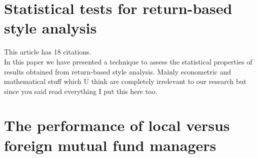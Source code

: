 \documentclass[12 pt]{article}
\begin{document}
\section{Statistical tests for return-based style analysis}
This article has 18 citations.\\
In this paper we have presented a technique to assess the statistical properties of results
obtained from return-based style analysis. Mainly econometric and mathematical stuff which U think are completely irrelevant to our research but since you said read everything I put this here too.
\section{The performance of local versus foreign mutual fund managers}
\end{document}

